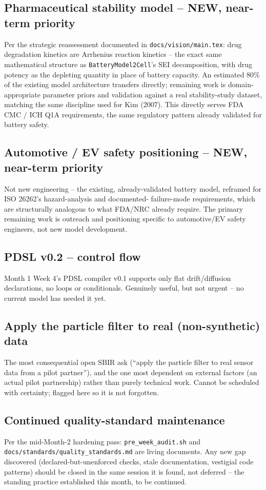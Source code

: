\documentclass[11pt]{article}
\begin{document}
\subsection*{Pharmaceutical stability model -- NEW, near-term priority}
Per the strategic reassessment documented in
\texttt{docs/vision/main.tex}: drug degradation kinetics are
Arrhenius reaction kinetics -- the exact same mathematical
structure as \texttt{BatteryModel2Cell}'s SEI decomposition, with
drug potency as the depleting quantity in place of battery
capacity. An estimated 80\% of the existing model architecture
transfers directly; remaining work is domain-appropriate parameter
priors and validation against a real stability-study dataset,
matching the same discipline used for Kim (2007). This directly
serves FDA CMC / ICH Q1A requirements, the same regulatory pattern
already validated for battery safety.

\subsection*{Automotive / EV safety positioning -- NEW, near-term priority}
Not new engineering -- the existing, already-validated battery
model, reframed for ISO 26262's hazard-analysis and documented-
failure-mode requirements, which are structurally analogous to
what FDA/NRC already require. The primary remaining work is
outreach and positioning specific to automotive/EV safety
engineers, not new model development.

\subsection*{PDSL v0.2 -- control flow}
Month 1 Week 4's PDSL compiler v0.1 supports only flat drift/diffusion
declarations, no loops or conditionals. Genuinely useful, but not
urgent -- no current model has needed it yet.

\subsection*{Apply the particle filter to real (non-synthetic) data}
The most consequential open SBIR ask (``apply the particle filter to
real sensor data from a pilot partner''), and the one most dependent
on external factors (an actual pilot partnership) rather than purely
technical work. Cannot be scheduled with certainty; flagged here so it
is not forgotten.

\subsection*{Continued quality-standard maintenance}
Per the mid-Month-2 hardening pass: \texttt{pre\_week\_audit.sh} and
\texttt{docs/standards/quality\_standards.md} are living documents.
Any new gap discovered (declared-but-unenforced checks, stale
documentation, vestigial code patterns) should be closed in the same
session it is found, not deferred -- the standing practice established
this month, to be continued.
\end{document}
